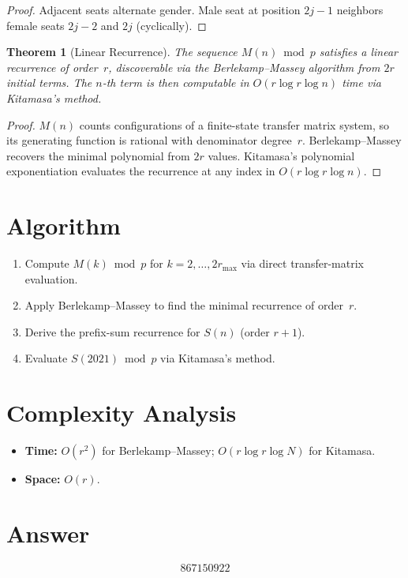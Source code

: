 \documentclass[11pt]{article}
\newtheorem{theorem}{Theorem}
\theoremstyle{definition}
\begin{document}
\begin{proof}
Adjacent seats alternate gender. Male seat at position $2j-1$ neighbors female seats $2j-2$ and $2j$ (cyclically).
\end{proof}

\begin{theorem}[Linear Recurrence]
The sequence $M(n) \bmod p$ satisfies a linear recurrence of order~$r$, discoverable via the Berlekamp--Massey algorithm from $2r$ initial terms. The $n$-th term is then computable in $O(r\log r\log n)$ time via Kitamasa's method.
\end{theorem}

\begin{proof}
$M(n)$ counts configurations of a finite-state transfer matrix system, so its generating function is rational with denominator degree~$r$. Berlekamp--Massey recovers the minimal polynomial from $2r$ values. Kitamasa's polynomial exponentiation evaluates the recurrence at any index in $O(r\log r\log n)$.
\end{proof}

\section{Algorithm}

\begin{enumerate}
\item Compute $M(k) \bmod p$ for $k = 2,\ldots,2r_{\max}$ via direct transfer-matrix evaluation.
\item Apply Berlekamp--Massey to find the minimal recurrence of order~$r$.
\item Derive the prefix-sum recurrence for $S(n)$ (order $r+1$).
\item Evaluate $S(2021) \bmod p$ via Kitamasa's method.
\end{enumerate}

\section{Complexity Analysis}

\begin{itemize}
\item \textbf{Time:} $O(r^2)$ for Berlekamp--Massey; $O(r\log r\log N)$ for Kitamasa.
\item \textbf{Space:} $O(r)$.
\end{itemize}

\section{Answer}

\[
\boxed{867150922}
\]
\end{document}
